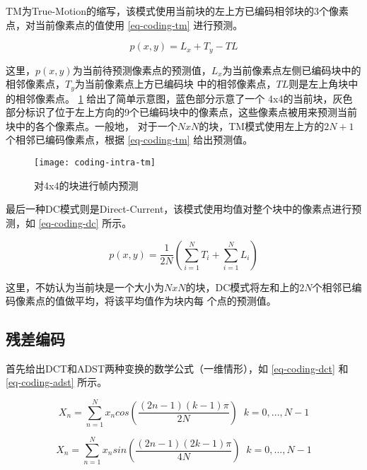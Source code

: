 TM为True-Motion的缩写，该模式使用当前块的左上方已编码相邻块的3个像素点，对当前像素点的值使用 \ref{eq-coding-tm} 进行预测。

\begin{equation}
\label{eq-coding-tm}
p(x, y) = L_x + T_y -TL
\end{equation}

这里，$p(x, y)$为当前待预测像素点的预测值，$L_x$为当前像素点左侧已编码块中的相邻像素点，$T_y$为当前像素点上方已编码块
中的相邻像素点，$TL$则是左上角块中的相邻像素点。 \ref{fig:coding-intra-tm} 给出了简单示意图，蓝色部分示意了一个
4x4的当前块，灰色部分标识了位于左上方向的9个已编码块中的像素点，这些像素点被用来预测当前块中的各个像素点。一般地，
对于一个$N x N$的块，TM模式使用左上方的$2N+1$个相邻已编码像素点，根据 \ref{eq-coding-tm} 给出预测值。

\begin{figure}[H] %
  \centering
  \texttt{[image: coding-intra-tm]}
  \caption{对4x4的块进行帧内预测}
  \label{fig:coding-intra-tm}
\end{figure}

最后一种DC模式则是Direct-Current，该模式使用均值对整个块中的像素点进行预测，如 \ref{eq-coding-dc} 所示。

\begin{equation}
\label{eq-coding-dc}
p(x, y) = \frac{1}{2N} (\sum_{i=1}^N T_i + \sum_{i=1}^N L_i)
\end{equation}

这里，不妨认为当前块是一个大小为$NxN$的块，DC模式将左和上的$2N$个相邻已编码像素点的值做平均，将该平均值作为块内每
个点的预测值。

\subsection{残差编码}

首先给出DCT和ADST两种变换的数学公式（一维情形），如 \ref{eq-coding-dct} 和 \ref{eq-coding-adst} 所示。

\begin{equation}
\label{eq-coding-dct}
X_n = \sum_{n=1}^N x_ncos(\frac{(2n-1)(k-1) \pi}{2N}) \;\; k=0,...,N-1
\end{equation}

\begin{equation}
\label{eq-coding-adst}
X_n = \sum_{n=1}^N x_nsin(\frac{(2n-1)(2k-1) \pi}{4N}) \;\; k=0,...,N-1
\end{equation}



